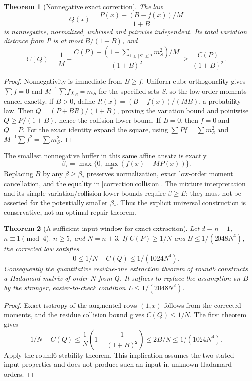 \documentclass[11pt]{article}
\newtheorem{theorem}{Theorem}[section]
\begin{document}
\begin{theorem}[Nonnegative exact correction]
The law
\[
 Q(x)=\frac{P(x)+(B-f(x))/M}{1+B}
\]
is nonnegative, normalized, unbiased and pairwise independent. Its
total variation distance from $P$ is at most $B/(1+B)$, and
\begin{equation}\label{correction:collision}
 C(Q)=\frac1M+
 \frac{C(P)-(1+\sum_{1\le|S|\le2}m_S^2)/M}{(1+B)^2}
 \ \ge\ \frac{C(P)}{(1+B)^2}.
\end{equation}
\end{theorem}
\begin{proof}
Nonnegativity is immediate from $B\ge f$. Uniform cube orthogonality
gives $\sum f=0$ and $M^{-1}\sum f\chi_S=m_S$ for the specified
sets $S$, so the low-order moments cancel exactly. If $B>0$, define
$R(x)=(B-f(x))/(MB)$, a probability law. Then
$Q=(P+BR)/(1+B)$, proving the variation bound and pointwise
$Q\ge P/(1+B)$, hence the collision lower bound. If $B=0$, then
$f=0$ and $Q=P$. For the exact identity expand the square, using
$\sum P f=\sum m_S^2$ and $M^{-1}\sum f^2=\sum m_S^2$.
\end{proof}

The smallest nonnegative buffer in this same affine ansatz is exactly
\[
 \beta_* =\max\{0,\max_x(f(x)-MP(x))\}.
\]
Replacing $B$ by any $\beta\ge\beta_*$ preserves normalization,
exact low-order moment cancellation, and the equality in
\eqref{correction:collision}. The mixture interpretation and its simple
variation/collision lower bounds require $\beta\ge B$; they must not
be asserted for the potentially smaller $\beta_*$. Thus the explicit
universal construction is conservative, not an optimal repair theorem.

\begin{theorem}[A sufficient input window for exact extraction]
Let $d=n-1$, $n\equiv1\pmod4$, $n\ge5$, and $N=n+3$.
If $C(P)\ge1/N$ and $B\le1/(2048N^3)$, the corrected law satisfies
\[
 0\le1/N-C(Q)\le1/(1024N^4).
\]
Consequently the quantitative residue-one extraction theorem of round6
constructs a Hadamard matrix of order $N$ from $Q$.
It suffices to replace the assumption on $B$ by the stronger,
easier-to-check condition $L\le1/(2048N^3)$.
\end{theorem}
\begin{proof}
Exact isotropy of the augmented rows $(1,x)$ follows from the
corrected moments, and the residue collision bound gives $C(Q)\le1/N$.
The first theorem gives
\[
 1/N-C(Q)\le\frac1N\left(1-\frac1{(1+B)^2}\right)
 \le 2B/N\le1/(1024N^4).
\]
Apply the round6 stability theorem. This implication assumes the two
stated input properties and does not produce such an input in unknown
Hadamard orders.
\end{proof}
\end{document}
